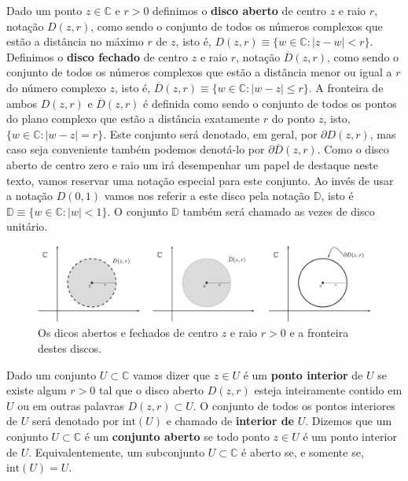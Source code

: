 Dado um ponto $z\in\mathbb{C}$ e $r>0$ definimos o {\bf disco aberto} de centro 
$z$ e raio $r$, notação $D(z,r)$,
como sendo o conjunto de todos os números complexos que estão a distância no máximo $r$ de $z$,
isto é, $D(z,r) \equiv \{w\in\mathbb{C}: |z-w|<r \}$.
Definimos o {\bf disco fechado} de centro $z$ e raio $r$, notação $\overline{D}(z,r)$, 
como sendo o conjunto de todos os números complexos que estão a distância menor ou igual a $r$ 
do número complexo $z$, isto é, $\overline{D}(z,r)\equiv \{w\in\mathbb{C}: |w-z|\leqslant r\}$.
A fronteira de ambos $D(z,r)$ e $\overline{D}(z,r)$ é definida como sendo o conjunto 
de todos os pontos do plano complexo que estão a distância exatamente $r$ do ponto $z$,
isto, $\{w\in \mathbb{C}: |w-z|=r\}$. Este conjunto será denotado, em geral, por $\partial D(z,r)$, 
mas caso seja conveniente também podemos denotá-lo por $\partial \overline{D}(z,r)$. 
Como o disco aberto de centro zero e raio um irá desempenhar um papel de destaque neste texto,
vamos reservar uma notação especial para este conjunto. Ao invés de usar a notação $D(0,1)$
vamos nos referir a este disco pela notação $\mathbb{D}$, isto é $\mathbb{D}\equiv \{w\in \mathbb{C}: |w|<1\}$.
O conjunto $\mathbb{D}$ também será chamado as vezes de disco unitário.


\begin{figure}[H]
\centering
\includegraphics[width=1\linewidth]{Figuras/discos-fronteira}
\caption{Os dicos abertos e fechados de centro $z$ e raio $r>0$ e a fronteira destes discos.}
\label{fig:discos-fronteira}
\end{figure}


\medskip 

Dado um conjunto $U\subset \mathbb{C}$ vamos dizer que $z\in U$ é um {\bf ponto interior} de $U$
se existe algum $r>0$ tal que o disco aberto $D(z,r)$ esteja inteiramente contido em $U$ ou 
em outras palavras $D(z,r)\subset U$. 
O conjunto de todos os pontos interiores de $U$
será denotado por $\mathrm{int}(U)$ e chamado de \textbf{interior de} $U$.
Dizemos que um conjunto $U\subset \mathbb{C}$ é um {\bf conjunto aberto} se todo ponto $z\in U$ é 
um ponto interior de $U$. 
Equivalentemente, um subconjunto $U\subset\mathbb{C}$ é aberto se, e somente se, 
$\mathrm{int}(U)=U$.

